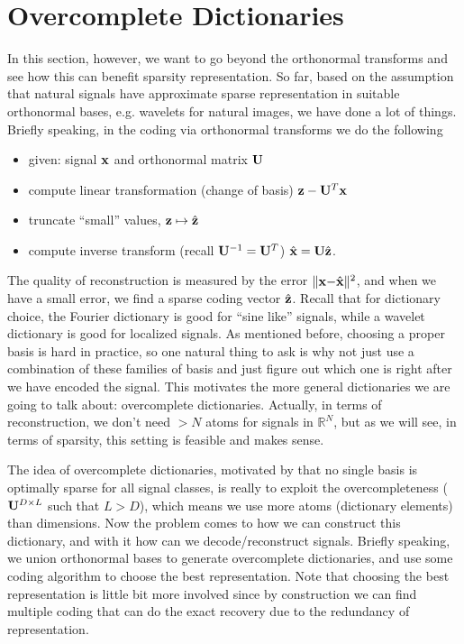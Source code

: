 \documentclass[../main.tex]{subfiles}
\begin{document}
\section{Overcomplete Dictionaries}
In this section, however, we want to go beyond the orthonormal transforms and see how this can benefit sparsity representation. So far, based on the assumption that natural signals have approximate sparse representation in suitable orthonormal bases, e.g. wavelets for natural images, we have done a lot of things. Briefly speaking, in the coding via orthonormal transforms we do the following
\begin{itemize}
	\item given: signal ${\bf x}$ and orthonormal matrix ${\bf U}$
	\item compute linear transformation (change of basis) ${\bf z}-{\bf U}^T{\bf x}$
	\item truncate ``small'' values, ${\bf z}\mapsto \hat{\bf z}$
	\item compute inverse transform (recall ${\bf U}^{-1}={\bf U}^T$) $\hat{\bf x}={\bf U}\hat{\bf z}$.
\end{itemize}
The quality of reconstruction is measured by the error $\|{\bf x-}\hat{\bf x}\|^2$, and when we have a small error, we find a sparse coding vector $\hat{\bf z}$. Recall that for dictionary choice, the Fourier dictionary is good for ``sine like'' signals, while a wavelet dictionary is good for localized signals. As mentioned before, choosing a proper basis is hard in practice, so one natural thing to ask is why not just use a combination of these families of basis and just figure out which one is right after we have encoded the signal. This motivates the more general dictionaries we are going to talk about: overcomplete dictionaries. Actually, in terms of reconstruction, we don't need $>N$ atoms for signals in $\mathbb{R}^N$, but as we will see, in terms of sparsity, this setting is feasible and makes sense.
\par The idea of overcomplete dictionaries, motivated by that no single basis is optimally sparse for all signal classes, is really to exploit the overcompleteness (${\bf U}^{D\times L}$ such that $L>D$), which means we use more atoms (dictionary elements) than dimensions. Now the problem comes to how we can construct this dictionary, and with it how can we decode/reconstruct signals. Briefly speaking, we union orthonormal bases to generate overcomplete dictionaries, and use some coding algorithm to choose the best representation. Note that choosing the best representation is little bit more involved since by construction we can find multiple coding that can do the exact recovery due to the redundancy of representation.
\end{document}
